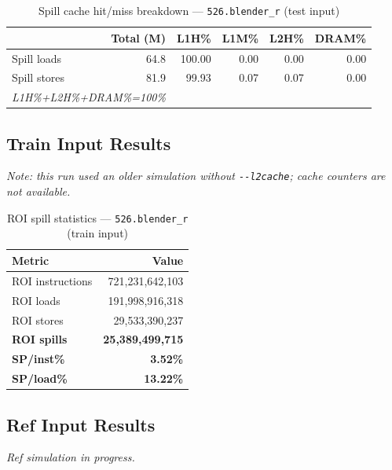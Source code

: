 \documentclass[11pt,a4paper]{article}
\begin{document}
\begin{table}[H]
\centering
\caption{Spill cache hit/miss breakdown --- \texttt{526.blender\_r} (test input)}
\label{tab:blender_test_cache}
\begin{tabular}{lrrrrr}
\toprule
\textbf{} & \textbf{Total (M)} & \textbf{L1H\%} & \textbf{L1M\%} & \textbf{L2H\%} & \textbf{DRAM\%} \\
\midrule
Spill loads  & 64.8 & 100.00 & 0.00 & 0.00 & 0.00 \\
Spill stores & 81.9 & 99.93 & 0.07 & 0.07 & 0.00 \\
\multicolumn{2}{l}{\small\textit{L1H\%+L2H\%+DRAM\%=100\%}} \\
\bottomrule
\end{tabular}
\end{table}

\subsection{Train Input Results}

\textit{Note: this run used an older simulation without \texttt{-{}-l2cache}; cache counters are not available.}


\begin{table}[H]
\centering
\caption{ROI spill statistics --- \texttt{526.blender\_r} (train input)}
\label{tab:blender_train_roi}
\begin{tabular}{lr}
\toprule
\textbf{Metric} & \textbf{Value} \\
\midrule
ROI instructions & 721,231,642,103 \\
ROI loads        & 191,998,916,318 \\
ROI stores       & 29,533,390,237 \\
\textbf{ROI spills}   & \textbf{25,389,499,715} \\
\textbf{SP/inst\%}   & \textbf{3.52\%} \\
\textbf{SP/load\%}   & \textbf{13.22\%} \\
\bottomrule
\end{tabular}
\end{table}

\subsection{Ref Input Results}
\textit{Ref simulation in progress.}



\end{document}
